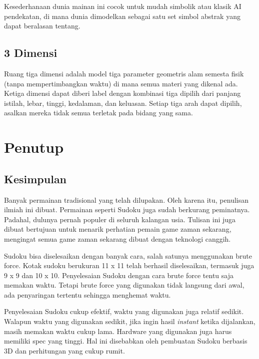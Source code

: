 \documentclass[11pt,a4paper]{report}
\begin{document}
Kesederhanaan dunia mainan ini cocok untuk mudah simbolik atau klasik AI pendekatan, di mana dunia dimodelkan sebagai satu set simbol abstrak yang dapat beralasan tentang.

\section{3 Dimensi}
Ruang tiga dimensi adalah model tiga parameter geometris alam semesta fisik (tanpa mempertimbangkan waktu) di mana semua materi yang dikenal ada. Ketiga dimensi dapat diberi label dengan kombinasi tiga dipilih dari panjang istilah, lebar, tinggi, kedalaman, dan keluasan. Setiap tiga arah dapat dipilih, asalkan mereka tidak semua terletak pada bidang yang sama.


\chapter{Penutup} %
\section{Kesimpulan}
\indent Banyak permainan tradisional yang telah dilupakan. Oleh karena itu, penulisan ilmiah ini dibuat. Permainan seperti Sudoku juga sudah berkurang peminatnya. Padahal, dulunya pernah populer di seluruh kalangan usia. Tulisan ini juga dibuat bertujuan untuk menarik perhatian pemain game zaman sekarang, mengingat semua game zaman sekarang dibuat dengan teknologi canggih.

\indent Sudoku bisa diselesaikan dengan banyak cara, salah satunya menggunakan brute force. Kotak sudoku berukuran 11 x 11 telah berhasil diselesaikan, termasuk juga 9 x 9 dan 10 x 10. Penyelesaian Sudoku dengan cara brute force tentu saja memakan waktu. Tetapi brute force yang digunakan tidak langsung dari awal, ada penyaringan tertentu sehingga menghemat waktu.

\indent Penyelesaian Sudoku cukup efektif, waktu yang digunakan juga relatif sedikit. Walapun waktu yang digunakan sedikit, jika ingin hasil \textit{instant} ketika dijalankan, masih memakan waktu cukup lama. Hardware yang digunakan juga harus memiliki spec yang tinggi. Hal ini disebabkan oleh pembuatan Sudoku berbasis 3D dan perhitungan yang cukup rumit.
\end{document}
